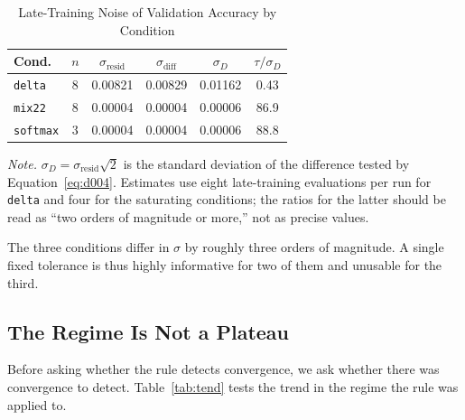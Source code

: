 \documentclass[jou,11pt,donotrepeattitle]{apa7}
\begin{document}
\begin{table}[htbp]
\caption{Late-Training Noise of Validation Accuracy by Condition}
\label{tab:ruido}
\small
\begin{tabular}{lccccc}
\toprule
Cond. & $n$ & $\sigma_{\text{resid}}$ & $\sigma_{\text{diff}}$ & $\sigma_D$ & $\tau/\sigma_D$ \\
\midrule
\texttt{delta}   & 8 & 0.00821 & 0.00829 & 0.01162 & 0.43 \\
\texttt{mix22}   & 8 & 0.00004 & 0.00004 & 0.00006 & 86.9 \\
\texttt{softmax} & 3 & 0.00004 & 0.00004 & 0.00006 & 88.8 \\
\bottomrule
\end{tabular}

\vspace{5pt}
{\small\raggedright \textit{Note.} $\sigma_D = \sigma_{\text{resid}}\sqrt{2}$ is the standard deviation of
the difference tested by Equation~\ref{eq:d004}. Estimates use eight late-training evaluations
per run for \texttt{delta} and four for the saturating conditions; the ratios for the latter
should be read as ``two orders of magnitude or more,'' not as precise values.
\par}
\end{table}

The three conditions differ in $\sigma$ by roughly three orders of magnitude. A single fixed
tolerance is thus highly informative for two of them and unusable for the third.

\subsection{The Regime Is Not a Plateau}

Before asking whether the rule detects convergence, we ask whether there was convergence to
detect. Table~\ref{tab:tend} tests the trend in the regime the rule was applied to.
\end{document}
